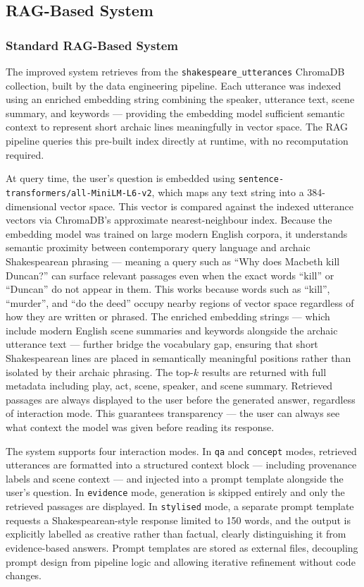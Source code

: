 \documentclass[10pt,conference]{IEEEtran}
\begin{document}
\subsection{RAG-Based System}

\subsubsection{Standard RAG-Based System}

The improved system retrieves from the
\texttt{shakespeare\_utterances} ChromaDB collection, built by the
data engineering pipeline. Each utterance was indexed using an
enriched embedding string combining the speaker, utterance text,
scene summary, and keywords --- providing the embedding model
sufficient semantic context to represent short archaic lines
meaningfully in vector space. The RAG pipeline queries this
pre-built index directly at runtime, with no recomputation required.

At query time, the user's question is embedded using
\texttt{sentence-transformers/all-MiniLM-L6-v2}, which maps any
text string into a 384-dimensional vector space. This vector is
compared against the indexed utterance vectors via ChromaDB's
approximate nearest-neighbour index. Because the embedding model
was trained on large modern English corpora, it understands
semantic proximity between contemporary query language and archaic
Shakespearean phrasing --- meaning a query such as ``Why does
Macbeth kill Duncan?'' can surface relevant passages even when the
exact words ``kill'' or ``Duncan'' do not appear in them. This
works because words such as ``kill'', ``murder'', and ``do the
deed'' occupy nearby regions of vector space regardless of how they
are written or phrased. The enriched embedding strings --- which
include modern English scene summaries and keywords alongside the
archaic utterance text --- further bridge the vocabulary gap,
ensuring that short Shakespearean lines are placed in semantically
meaningful positions rather than isolated by their archaic
phrasing. The top-$k$ results are returned with full metadata
including play, act, scene, speaker, and scene summary. Retrieved
passages are always displayed to the user before the generated
answer, regardless of interaction mode. This guarantees transparency
--- the user can always see what context the model was given before
reading its response.

The system supports four interaction modes. In \texttt{qa} and
\texttt{concept} modes, retrieved utterances are formatted into a
structured context block --- including provenance labels and scene
context --- and injected into a prompt template alongside the
user's question. In \texttt{evidence} mode, generation is skipped
entirely and only the retrieved passages are displayed. In
\texttt{stylised} mode, a separate prompt template requests a
Shakespearean-style response limited to 150 words, and the output
is explicitly labelled as creative rather than factual, clearly
distinguishing it from evidence-based answers. Prompt templates are
stored as external files, decoupling prompt design from pipeline
logic and allowing iterative refinement without code changes.
\end{document}
